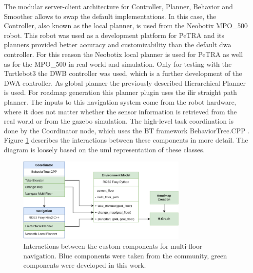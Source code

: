 The modular server-client architecture for Controller, Planner, Behavior and Smoother allows to swap the default implementations. In this case, the Controller, also known as the local planner, is used from the Neobotix MPO\_500 robot. This robot was used as a development platform for PeTRA and its planners provided better accuracy and customizability than the default \gls{dwa} controller. For this reason the Neobotix local planner \cite{pradheep_krishna_neobotixneo_local_planner2_2021} is used for PeTRA as well as for the MPO\_500 in real world and simulation. Only for testing with the Turtlebot3 the DWB controller was used, which is a further development of the DWA controller. As global planner the previously described Hierarchical Planner is used. For roadmap generation this planner plugin uses the \gls{ilir} straight path planner. The inputs to this navigation system come from the robot hardware, where it does not matter whether the sensor information is retrieved from the real world or from the gazebo simulation. The high-level task coordination is done by the Coordinator node, which uses the BT framework BehaviorTree.CPP \cite{auryn_robotics_behaviortreecpp_2023}. Figure \ref{fig:concept_uml} describes the interactions between these components in more detail. The diagram is loosely based on the \gls{uml} representation of these classes.

\begin{figure}[h]
    \centering
    \includegraphics[width=0.75\textwidth]{figures/40_concept/concept_uml.png}
    \caption[Interactions between the custom components for multi-floor navigation]{Interactions between the custom components for multi-floor navigation. Blue components were taken from the community, green components were developed in this work.}
    \label{fig:concept_uml}
\end{figure}

